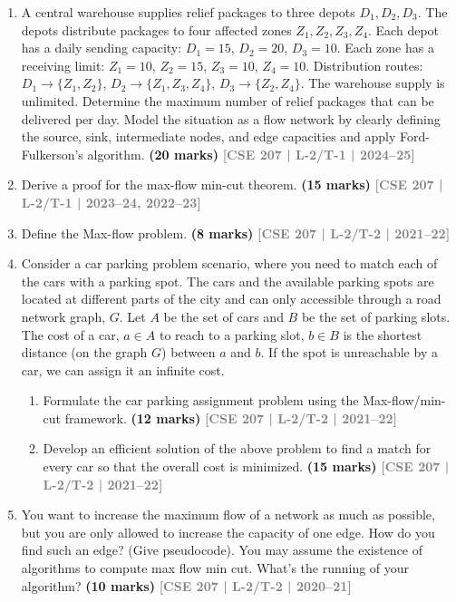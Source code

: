 \documentclass[12pt]{article}
\newcommand{\yr}[1]{\hfill\textcolor{gray}{\small\textbf{[#1]}}}
\newcommand{\mk}[1]{\textcolor{orange!70!black}{\small\textbf{(#1 marks)}}}
\begin{document}
\begin{enumerate}

\item A central warehouse supplies relief packages to three depots $D_1, D_2, D_3$. The depots distribute packages to four affected zones $Z_1, Z_2, Z_3, Z_4$. Each depot has a daily sending capacity: $D_1 = 15$, $D_2 = 20$, $D_3 = 10$. Each zone has a receiving limit: $Z_1 = 10$, $Z_2 = 15$, $Z_3 = 10$, $Z_4 = 10$. Distribution routes: $D_1 \to \{Z_1, Z_2\}$, $D_2 \to \{Z_1, Z_3, Z_4\}$, $D_3 \to \{Z_2, Z_4\}$. The warehouse supply is unlimited. Determine the maximum number of relief packages that can be delivered per day. Model the situation as a flow network by clearly defining the source, sink, intermediate nodes, and edge capacities and apply Ford-Fulkerson's algorithm.
\mk{20} \yr{CSE 207 | L-2/T-1 | 2024--25}


\item Derive a proof for the max-flow min-cut theorem.
\mk{15} \yr{CSE 207 | L-2/T-1 | 2023--24, 2022--23}


\item Define the Max-flow problem.
\mk{8} \yr{CSE 207 | L-2/T-2 | 2021--22}


\item Consider a car parking problem scenario, where you need to match each of the cars with a parking spot. The cars and the available parking spots are located at different parts of the city and can only accessible through a road network graph, $G$. Let $A$ be the set of cars and $B$ be the set of parking slots. The cost of a car, $a \in A$ to reach to a parking slot, $b \in B$ is the shortest distance (on the graph $G$) between $a$ and $b$. If the spot is unreachable by a car, we can assign it an infinite cost.
\begin{enumerate}
\item Formulate the car parking assignment problem using the Max-flow/min-cut framework.
\mk{12} \yr{CSE 207 | L-2/T-2 | 2021--22}

\item Develop an efficient solution of the above problem to find a match for every car so that the overall cost is minimized.
\mk{15} \yr{CSE 207 | L-2/T-2 | 2021--22}
\end{enumerate}


\item You want to increase the maximum flow of a network as much as possible, but you are only allowed to increase the capacity of one edge. How do you find such an edge? (Give pseudocode). You may assume the existence of algorithms to compute max flow min cut. What's the running of your algorithm?
\mk{10} \yr{CSE 207 | L-2/T-2 | 2020--21}



\end{enumerate}
\end{document}
